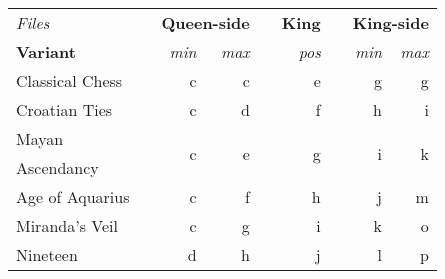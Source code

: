 \begin{table}[!h]
\centering
\begin{tabular}{ lcrrcrcrr }
\toprule %
\emph{Files}          & & \multicolumn{2}{c}{ \textbf{Queen-side} }     & & \textbf{King}       & & \multicolumn{2}{c}{ \textbf{King-side} }    \\
\cmidrule{1-1}          \cmidrule{3-4}                                    \cmidrule{6-6}          \cmidrule{8-9} %
\textbf{Variant}      & & \emph{min}            & \emph{max}            & & \emph{pos}          & & \emph{min}          & \emph{max}            \\
\midrule %
Classical Chess       & & c                     & c                     & & e                   & & g                   & g                     \\
Croatian Ties         & & c                     & d                     & & f                   & & h                   & i                     \\
\cmidrule{1-9} %
Mayan                 & & \multirow{2}{*}{c}    & \multirow{2}{*}{e}    & & \multirow{2}{*}{g}  & & \multirow{2}{*}{i}  & \multirow{2}{*}{k}    \\
Ascendancy            & &                       &                       & &                     & &                     &                       \\
\cmidrule{1-9} %
Age of Aquarius       & & c                     & f                     & & h                   & & j                   & m                     \\
Miranda's Veil        & & c                     & g                     & & i                   & & k                   & o                     \\
Nineteen              & & d                     & h                     & & j                   & & l                   & p                     \\

\end{tabular}
\end{table}
